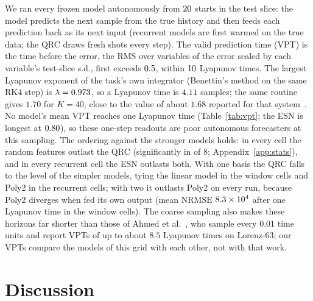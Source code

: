 \documentclass[11pt,a4paper]{article}
\newcommand{\nrmse}{\mathrm{NRMSE}}
\begin{document}
We ran every frozen model autonomously from $\nStarts$ starts in the test slice: the model predicts
the next sample from the true history and then feeds each prediction back as its next input
(recurrent models are first warmed on the true data; the QRC draws fresh shots every step). The valid
prediction time (VPT) is the time before the error, the RMS over variables of the error scaled by
each variable's test-slice s.d., first exceeds $\vptThreshold$, within $10$ Lyapunov times.
The largest Lyapunov exponent of the task's own integrator (Benettin's method on the same RK4 step) is
$\lambda=0.973$, so a Lyapunov time is $4.11$ samples; the same routine gives $1.70$ for
$K=40$, close to the value of about $1.68$ reported for that system~\cite{vlachas2020}. No model's
mean VPT reaches one Lyapunov time (Table~\ref{tab:vpt}; the ESN is longest at $0.80$), so these
one-step readouts are poor autonomous forecasters at this sampling. The ordering against the
stronger models holds: in every cell the random features outlast the QRC (significantly in
\vptSigRfCells{} of 8; Appendix~\ref{app:stats}), and in every recurrent cell the ESN outlasts both.
With one basis the QRC falls to the level of the simpler models, tying the linear model in the
window cells and Poly2 in the recurrent cells; with two it outlasts Poly2 on every run, because Poly2
diverges when fed its own output (mean $\nrmse$ $8.3\times10^{4}$ after one Lyapunov time in the
window cells). The coarse sampling also makes these horizons far shorter than those of
Ahmed et al.~\cite{ahmed2024}, who sample every $0.01$ time units and report VPTs of up to about $8.5$
Lyapunov times on Lorenz-63; our VPTs compare the models of this grid with each other, not with that
work.

\begin{table}[htbp]
\centering
\caption{Free run: mean VPT in Lyapunov times $\pm$ s.d.\ over 25 runs, mean in samples in
parentheses ($\nStarts$ starts per run, threshold $\vptThreshold$). Bold: longest in the cell.}
\label{tab:vpt}
\footnotesize\setlength{\tabcolsep}{3pt}
\end{table}

\section{Discussion}
\label{sec:discussion}
\end{document}
